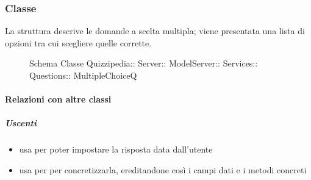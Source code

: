 \subsubsection{Classe }
La struttura descrive le domande a scelta multipla; viene presentata una lista di opzioni tra cui scegliere quelle corrette.
\begin{figure}[H]
\centering
\noindent{}
\caption[Schema Classe MultipleChoiceQ]{Schema Classe Quizzipedia:: Server:: ModelServer:: Services:: Questions:: MultipleChoiceQ}
\end{figure}
\paragraph{Relazioni con altre classi}
\subparagraph{Uscenti}
\begin{itemize}
\item usa  per poter impostare la risposta data dall'utente
\item usa  per per concretizzarla, ereditandone così i campi dati e i metodi concreti
\end{itemize}
